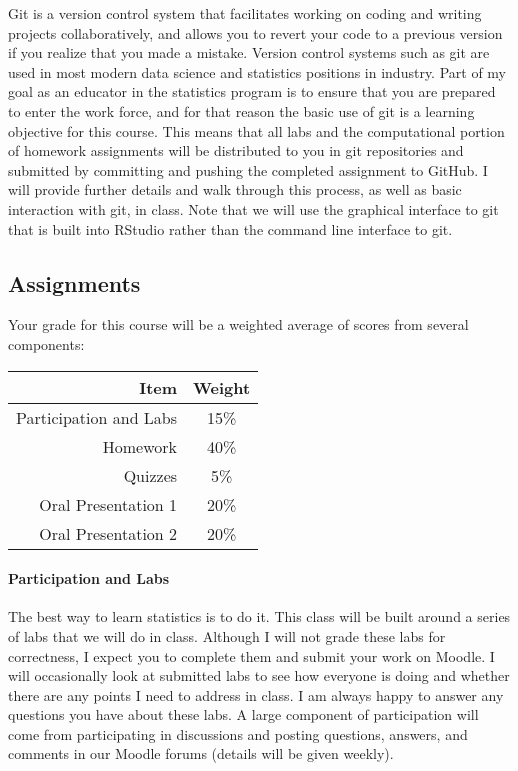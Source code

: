 \documentclass[11pt]{article}
\begin{document}
Git is a version control system that facilitates working on coding and writing projects collaboratively, and allows you to revert your code to a previous version if you realize that you made a mistake.  Version control systems such as git are used in most modern data science and statistics positions in industry.  Part of my goal as an educator in the statistics program is to ensure that you are prepared to enter the work force, and for that reason the basic use of git is a learning objective for this course.  This means that all labs and the computational portion of homework assignments will be distributed to you in git repositories and submitted by committing and pushing the completed assignment to GitHub.  I will provide further details and walk through this process, as well as basic interaction with git, in class.  Note that we will use the graphical interface to git that is built into RStudio rather than the command line interface to git.

\subsection*{Assignments}

Your grade for this course will be a weighted average of scores from several components:

\begin{table}[!h]
\centering
\begin{tabular}{r c}
\toprule
Item & Weight \\
\midrule
Participation and Labs & 15\% \\
\cmidrule(r){1-2}
Homework & 40\% \\
\cmidrule(r){1-2}
Quizzes & 5\% \\
\cmidrule(r){1-2}
Oral Presentation 1 & 20\%\\
Oral Presentation 2 & 20\%\\
\bottomrule
\end{tabular}
\end{table}

\paragraph{Participation and Labs}
The best way to learn statistics is to do it.  This class will be built around a series of labs that we will do in class.  Although I will not grade these labs for correctness, I expect you to complete them and submit your work on Moodle.  I will occasionally look at submitted labs to see how everyone is doing and whether there are any points I need to address in class.  I am always happy to answer any questions you have about these labs. A large component of participation will come from participating in discussions and posting questions, answers, and comments in our Moodle forums (details will be given weekly).
\end{document}
